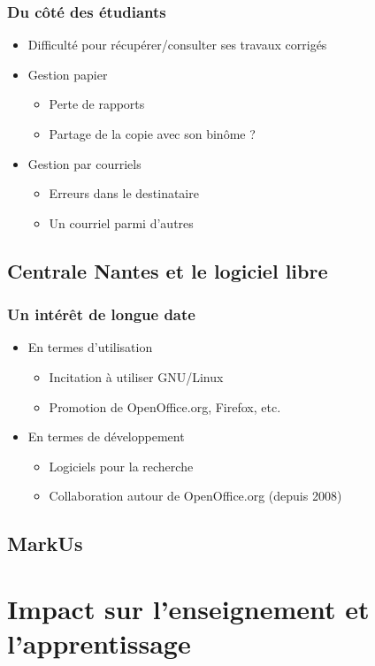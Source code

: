 \documentclass[hyperref,french,usenames,xcolor=dvipsnames]{beamer}
\begin{document}
\frame
{
  \frametitle{Du côté des étudiants}

\begin{itemize}
\item Difficulté pour récupérer/consulter ses travaux corrigés
\item Gestion papier
\begin{itemize}
\item Perte de rapports
\item Partage de la copie avec son binôme ?
\end{itemize}
\item Gestion par courriels
\begin{itemize}
\item Erreurs dans le destinataire
\item Un courriel parmi d'autres
\end{itemize}
\end{itemize}
}

\subsection*{Centrale Nantes et le logiciel libre}

\frame
{
  \frametitle{Un intérêt de longue date}
  
\begin{itemize}
\item En termes d'utilisation 
\begin{itemize}  
\item Incitation à utiliser GNU/Linux 
\item Promotion de OpenOffice.org, Firefox, etc. 
\end{itemize}
\item En termes de développement 
\begin{itemize} 
\item Logiciels pour la recherche
\item Collaboration autour de OpenOffice.org (depuis 2008) 
\end{itemize}
\end{itemize}
}

\subsection*{MarkUs}


\section*{Impact sur l'enseignement et l'apprentissage}
\end{document}
